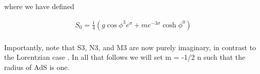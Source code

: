 \documentclass{article}
\begin{document}
where we have defined


\begin{equation}
\begin{array} { c } { S _ { 0 } = \frac { 1 } { 4 } \left ( g \cos \phi ^ { 3 } e ^ { \sigma } + m e ^ { - 3 \sigma } \cosh \phi ^ { 0 } \right ) } \\ { \qquad }\end{array}
\end{equation}


Importantly, note that S3, N3, and M3 are now purely imaginary, in contrast to the Lorentzian
case . In all that follows we will set m = -1/2 n such that the radius of AdS is one.
\end{document}
